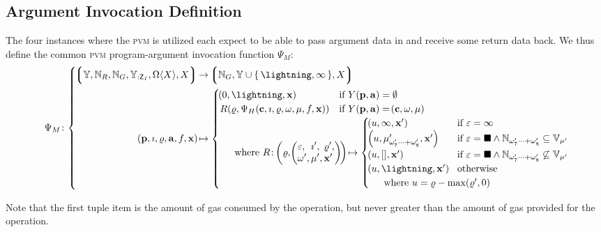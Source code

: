 \subsection{Argument Invocation Definition}

The four instances where the \textsc{pvm} is utilized each expect to be able to pass argument data in and receive some return data back. We thus define the common \textsc{pvm} program-argument invocation function $\Psi_M$:
\begin{equation}
  \Psi_M\colon \abracegroup{
    \tuple{
      \blob, \pvmreg, \gas, \bloboflen{:\mathsf{Z}_I}, \Omega\ang{X}, X
    } &\to \tuple{\gas, \blob \cup \set{\panic, \oog}, X}\\
    \tup{\mathbf{p}, \imath, \gascounter, \mathbf{a}, f, \mathbf{x}} &\mapsto \begin{cases}
      \tup{0, \panic, \mathbf{x}} &\when Y(\mathbf{p}, \mathbf{a}) = \none\\
      R(\gascounter, \Psi_H(\mathbf{c}, \imath, \gascounter, \registers, \mem, f, \mathbf{x})) &\when Y(\mathbf{p}, \mathbf{a}) = \tup{\mathbf{c}, \registers, \mem}\\
      \multicolumn{2}{l}{
        \quad \where R \colon \tup{\gascounter, \tup{\begin{alignedat}{5}
          &\varepsilon,\, &&\imath',\, &&\gascounter',\\
          &\registers',\, &&\mem',\, &&\mathbf{x}'
        \end{alignedat}
        }} \mapsto \begin{cases}
          \tup{u, \oog, \mathbf{x}'} &\when \varepsilon = \oog \\
          \tup{u, \memory'_{\registers'_{7}\dots+\registers'_{8}}, \mathbf{x}'} &\when \varepsilon = \halt \wedge \Nrange{\registers'_{7}}{\registers'_{8}} \subseteq \readable{\mem'} \\
          \tup{u, [], \mathbf{x}'} &\when \varepsilon = \halt \wedge \Nrange{\registers'_{7}}{\registers'_{8}} \not\subseteq \readable{\mem'} \\
          \tup{u, \panic, \mathbf{x}'} &\otherwise \\
          \multicolumn{2}{l}{\quad \where u = \gascounter - \max(\gascounter', 0)}
        \end{cases}
      }\!\!\!\!\!\!\!\!
    \end{cases}
  }
\end{equation}

Note that the first tuple item is the amount of gas consumed by the operation, but never greater than the amount of gas provided for the operation.
